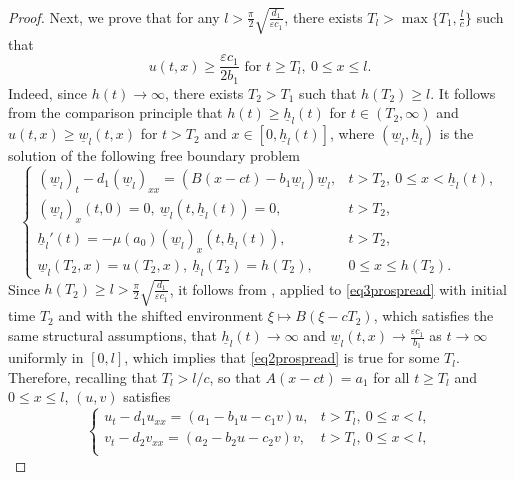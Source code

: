\documentclass[reqno]{amsart}
\newcommand{\rev}[1]{#1}
\theoremstyle{plain}
\theoremstyle{definition}
\theoremstyle{remark}
\begin{document}
\begin{proof}
		Next, we prove that for any $l > \frac{\pi}{2}\sqrt{\frac{d_1}{\varepsilon c_1}}$,
		there exists $T_l > \max\{T_1, \frac{l}{c}\}$ such that
		\begin{equation}\label{eq2prospread}
			u(t,x) \geq \frac{\varepsilon c_1}{2b_1}
			\text{ for } t \geq T_l,~ 0 \leq x \leq l.
		\end{equation}
		Indeed, since $h(t) \to \infty$, there exists $T_2 > T_1$ such that
		$h(T_2) \ge l$. It follows from the comparison principle that $h(t) \ge \rev{\underline{h}_l(t)}$ for $t \in (T_2, \infty)$ and $u(t, x) \ge \rev{\underline{w}_l(t,x)}$ for $t > T_2$ and $x \in [0,\rev{\underline{h}_l(t)}]$, where $\rev{(\underline{w}_l, \underline{h}_l)}$ is the solution of
		the following free boundary problem
		\begin{equation}\label{eq3prospread}
			\rev{\begin{cases}
				(\underline{w}_l)_t - d_1(\underline{w}_l)_{xx}
				= (B(x - ct) - b_1\underline{w}_l)\underline{w}_l,
				& t > T_2,~ 0 \leq x < \underline{h}_l(t),\\
				(\underline{w}_l)_x(t,0) = 0,
				~ \underline{w}_l(t, \underline{h}_l(t)) = 0,
				& t > T_2,\\
				\underline{h}_l'(t) = -\mu(a_0)(\underline{w}_l)_x(t,\underline{h}_l(t)),
				& t > T_2,\\
				\underline{w}_l(T_2,x) = u(T_2,x),
				~ \underline{h}_l(T_2) = h(T_2),
				& 0 \leq x \le h(T_2).
			\end{cases}}
		\end{equation}
		Since $h(T_2) \ge l > \frac{\pi}{2}\sqrt{\frac{d_1}{\varepsilon c_1}}$, it
		follows from \cite[Theorems~1.2--1.5]{HU20205931}\rev{, applied to
		\eqref{eq3prospread} with initial time $T_2$ and with the shifted
		environment $\xi\mapsto B(\xi-cT_2)$, which satisfies the same structural
		assumptions,} that $\rev{\underline{h}_l(t)} \to
		\infty$ and $\rev{\underline{w}_l(t,x)} \to \frac{\varepsilon c_1}{b_1}$ as
		$t \to \infty$ uniformly in $[0,l]$, which implies that \eqref{eq2prospread} is
		true for some $T_l$. Therefore, \rev{recalling that $T_l>l/c$, so that
		$A(x-ct)=a_1$ for all $t\ge T_l$ and $0\le x\le l$,} $(u,v)$ satisfies
		\begin{equation}\label{eq4prospread}
			\begin{cases}
				u_t - d_1u_{xx} = (a_1 - b_1u - c_1v)u,
				& t > T_l,~ 0 \leq x < l,\\
				v_t - d_2v_{xx} = (a_2 - b_2u - c_2v)v,
				& t > T_l,~ 0 \leq x < l,\\

\end{cases}
\end{equation}
\end{proof}
\end{document}
